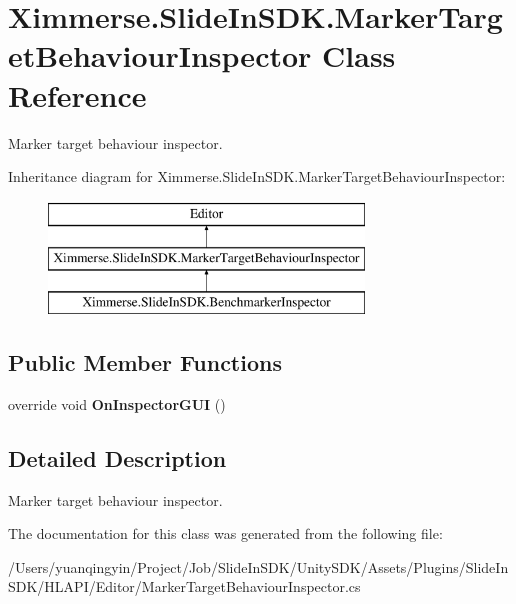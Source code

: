 \hypertarget{class_ximmerse_1_1_slide_in_s_d_k_1_1_marker_target_behaviour_inspector}{}\section{Ximmerse.\+Slide\+In\+S\+D\+K.\+Marker\+Target\+Behaviour\+Inspector Class Reference}
\label{class_ximmerse_1_1_slide_in_s_d_k_1_1_marker_target_behaviour_inspector}


Marker target behaviour inspector.  


Inheritance diagram for Ximmerse.\+Slide\+In\+S\+D\+K.\+Marker\+Target\+Behaviour\+Inspector\+:\begin{figure}[H]
\begin{center}
\leavevmode
\includegraphics[height=3.000000cm]{class_ximmerse_1_1_slide_in_s_d_k_1_1_marker_target_behaviour_inspector}
\end{center}
\end{figure}
\subsection*{Public Member Functions}
\begin{DoxyCompactItemize}
\item 
\mbox{\label{class_ximmerse_1_1_slide_in_s_d_k_1_1_marker_target_behaviour_inspector_a15874df7dd98cf4c8c9a43993bc4f43a}} 
override void {\bfseries On\+Inspector\+G\+UI} ()
\end{DoxyCompactItemize}


\subsection{Detailed Description}
Marker target behaviour inspector. 



The documentation for this class was generated from the following file\+:\begin{DoxyCompactItemize}
\item 
/\+Users/yuanqingyin/\+Project/\+Job/\+Slide\+In\+S\+D\+K/\+Unity\+S\+D\+K/\+Assets/\+Plugins/\+Slide\+In\+S\+D\+K/\+H\+L\+A\+P\+I/\+Editor/Marker\+Target\+Behaviour\+Inspector.\+cs\end{DoxyCompactItemize}
